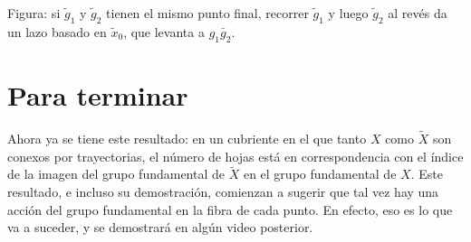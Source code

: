 \documentclass[11pt]{article}
\begin{document}
\begin{center}
\end{center}

\noindent Figura: si $\tilde g_1$ y $\tilde g_2$ tienen el mismo punto final, recorrer $\tilde g_1$ y luego $\tilde g_2$ al revés da un lazo basado en $\tilde x_0$, que levanta a $g_1\bar g_2$.

\section*{Para terminar}

Ahora ya se tiene este resultado: en un cubriente en el que tanto $X$ como $\tilde X$ son conexos por trayectorias, el número de hojas está en correspondencia con el índice de la imagen del grupo fundamental de $\tilde X$ en el grupo fundamental de $X$. Este resultado, e incluso su demostración, comienzan a sugerir que tal vez hay una acción del grupo fundamental en la fibra de cada punto. En efecto, eso es lo que va a suceder, y se demostrará en algún video posterior.

\begin{erratas}
\end{erratas}
\end{document}
